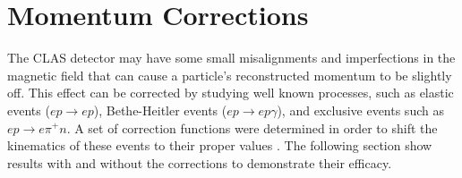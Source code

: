 \chapter{Momentum Corrections}
\label{cha:MoCo}
%
The CLAS detector may have some small misalignments and imperfections in the magnetic field that can cause a particle's reconstructed momentum to be slightly off.
This effect can be corrected by studying well known processes, such as elastic events ($ep \rightarrow ep$), Bethe-Heitler events ($ep \rightarrow ep\gamma$), and exclusive events such as $ep \rightarrow e\pi^+n$.
A set of correction functions were determined in order to shift the kinematics of these events to their proper values \cite{MirazitaMoCo}.
The following section show results with and without the corrections to demonstrate their efficacy.
%

